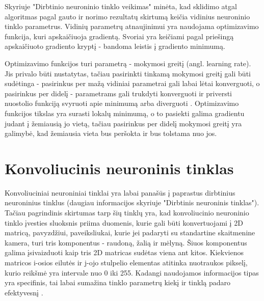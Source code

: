 \documentclass{VUMIFPSkursinis}
\begin{document}
Skyriuje "Dirbtinio neuroninio tinklo veikimas" minėta, kad sklidimo atgal algoritmas pagal gauto ir norimo 
rezultatų skirtumą keičia vidinius neuroninio tinklo parametrus. Vidinių parametrų atnaujinimui yra naudojama 
optimizavimo funkcija, kuri apskaičiuoja gradientą. Svoriai yra keičiami pagal priešingą apskaičiuoto gradiento 
kryptį - bandoma leistis į gradiento minimumą.

Optimizavimo funkcijos turi parametrą - mokymosi greitį (angl. learning rate). Jis privalo būti nustatytas, tačiau 
pasirinkti tinkamą mokymosi greitį gali būti sudėtinga - pasirinkus per mažą vidiniai parametrai gali labai lėtai 
konverguoti, o pasirinkus per didelį - parametrams gali trukdyti konverguoti ir priversti nuostolio funkciją svyruoti
apie minimumą arba diverguoti \cite{leondes1998image}. Optimizavimo funkcijos tikslas yra surasti lokalų minimumą, 
o to pasiekti galima gradientu judant į žemiausią jo vietą, tačiau pasirinkus per didelį mokymosi greitį yra galimybė, 
kad žemiausia vieta bus peršokta ir bus tolstama nuo jos.




\section{Konvoliucinis neuroninis tinklas}
Konvoliuciniai neuroniniai tinklai yra labai panašūs į paprastus dirbtinius neuroninius tinklus (daugiau informacijos skyriuje "Dirbtinis neuroninis
tinklas"). Tačiau pagrindinis skirtumas tarp šių tinklų yra, kad konvoliucinio neuroninio tinklo įvesties sluoksnis priima duomenis, kurie gali būti konvertuojami į 2D matricą, pavyzdžiui, paveiksliukai, 
kurie jei padaryti su standartine skaitmenine kamera, turi tris komponentus - raudoną, žalią ir mėlyną. Šiuos komponentus galima 
įsivaizduoti kaip tris 2D matricas sudėtas viena ant kitos. Kiekvienos matricos i-osios eilutės ir j-ojo stulpelio elementas 
atitinka nuotraukos pikselį, kurio reikšmė yra intervale nuo 0 iki 255. Kadangi naudojamos informacijos tipas yra specifinis, 
tai labai sumažina tinklo parametrų kiekį ir tinklą padaro efektyvesnį \cite{CnnImages}.
\end{document}
